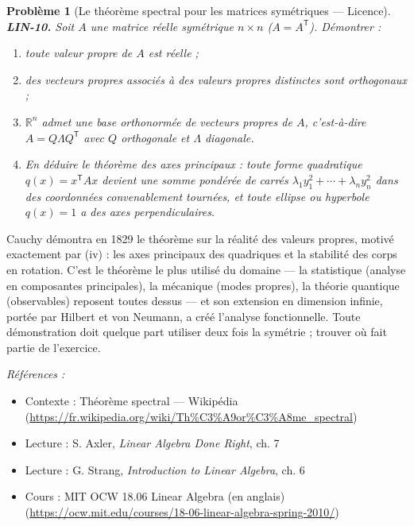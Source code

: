 \documentclass[11pt]{article}
\newtheorem{problem}{Problème}
\newenvironment{refs}{\par\small\noindent\emph{Références :}\begin{itemize}\setlength\itemsep{0pt}}{\end{itemize}\normalsize}
\begin{document}
\bigskip

\begin{problem}[{Le théorème spectral pour les matrices symétriques --- Licence}]
\textbf{LIN-10.} Soit $A$ une matrice réelle symétrique $n \times n$
($A = A^{\mathsf{T}}$). Démontrer :
\begin{enumerate}
\item[(i)] toute valeur propre de $A$ est réelle ;
\item[(ii)] des vecteurs propres associés à des
valeurs propres distinctes sont orthogonaux ;
\item[(iii)] $\mathbb{R}^n$ admet une base orthonormée de
vecteurs propres de $A$, c'est-à-dire $A = Q \Lambda Q^{\mathsf{T}}$ avec $Q$ orthogonale et
$\Lambda$ diagonale.
\item[(iv)] En déduire le théorème des axes principaux : toute forme quadratique
$q(x) = x^{\mathsf{T}} A x$ devient une somme pondérée de carrés
$\lambda_1 y_1^2 + \cdots + \lambda_n y_n^2$ dans des coordonnées convenablement tournées, et toute
ellipse ou hyperbole $q(x) = 1$ a des axes perpendiculaires.
\end{enumerate}

\end{problem}

\noindent Cauchy démontra en 1829 le théorème sur la réalité des valeurs propres, motivé
exactement par (iv) : les axes principaux des quadriques et la stabilité des corps en rotation. C'est
le théorème le plus utilisé du domaine --- la statistique (analyse en composantes principales), la
mécanique (modes propres), la théorie quantique (observables) reposent toutes dessus --- et son
extension en dimension infinie, portée par Hilbert et von Neumann, a créé l'analyse fonctionnelle.
Toute démonstration doit quelque part utiliser deux fois la symétrie ; trouver où fait partie de
l'exercice.

\begin{refs}
\item Contexte : Théorème spectral --- Wikipédia (\url{https://fr.wikipedia.org/wiki/Th%C3%A9or%C3%A8me_spectral})
\item Lecture : S. Axler, \textit{Linear Algebra Done Right}, ch. 7
\item Lecture : G. Strang, \textit{Introduction to Linear Algebra}, ch. 6
\item Cours : MIT OCW 18.06 Linear Algebra (en anglais) (\url{https://ocw.mit.edu/courses/18-06-linear-algebra-spring-2010/})
\end{refs}
\end{document}
